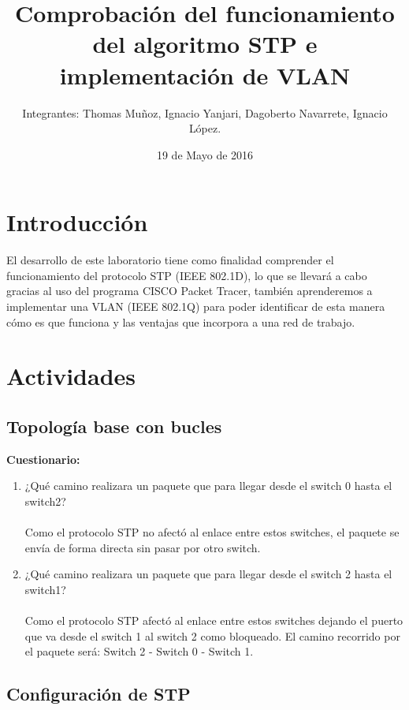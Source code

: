 \documentclass{udpreport}
\title{Comprobación del funcionamiento del algoritmo STP e implementación de VLAN}
\author{Integrantes: Thomas Muñoz, Ignacio Yanjari, Dagoberto Navarrete, Ignacio López.}
\date{19 de Mayo de 2016}
\begin{document}
\maketitle
\tableofcontents
\listoffigures
\chapter{Introducción}
  El desarrollo de este laboratorio tiene como finalidad comprender el funcionamiento del protocolo STP (IEEE 802.1D), lo que se
  llevará a cabo gracias al uso del programa CISCO Packet Tracer, también aprenderemos a implementar una VLAN (IEEE 802.1Q) para poder
  identificar de esta manera cómo es que funciona y las ventajas que incorpora a una red de trabajo.
\chapter{Actividades}
	\section{Topología base con bucles}
	
	{\large \bf{Cuestionario: }}\\
	\begin{enumerate}
	    \item ¿Qué camino realizara un paquete que para llegar desde el switch
0 hasta el switch2?\\\\
    Como el protocolo STP no afectó al enlace entre estos switches, el paquete se envía de forma directa sin pasar por otro switch.
    
        \item ¿Qué camino realizara un paquete que para llegar desde el switch
2 hasta el switch1?\\\\
    Como el protocolo STP afectó al enlace entre estos switches dejando el puerto que va desde el switch 1 al switch 2 como bloqueado. El camino recorrido por el paquete será: Switch 2 - Switch 0 - Switch 1. 
	\end{enumerate}
	\section{Configuración de STP}
	
\end{document}
